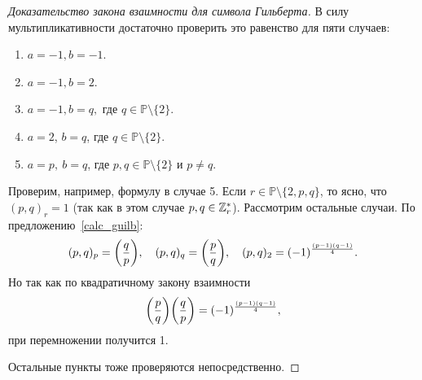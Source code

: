 		\begin{proof}[Доказательство закона взаимности для символа Гильберта]
			В силу мультипликативности достаточно проверить это равенство для пяти случаев: 
			\begin{enumerate}
				\item $a = -1, b = -1$.
				\item $a = -1, b = 2$.
				\item $a = -1, b = q, $ где $q \in \mathbb{P} \setminus \{ 2 \}$. 
				\item $a = 2$, $b = q$, где $q \in \mathbb{P} \setminus \{ 2 \}$.
				\item $a = p, \ b = q$, где $p, q \in \mathbb{P} \setminus \{ 2 \}$ и $p \neq q$.
			\end{enumerate}
			Проверим, например, формулу в случае 5. Если  $r \in \mathbb{P} \setminus \{ 2, p, q \}$, то ясно, что $(p, q)_{r} = 1$ (так как в этом случае $p, q \in \mathbb{Z}_{r}^{*}$). 
			Рассмотрим остальные случаи. По предложению~\ref{calc_guilb}:
			\[
				(p, q)_{p} = \lr*{\frac{q}{p}}, \quad (p, q)_{q} = \lr*{\frac{p}{q}}, \quad (p, q)_{2} = (-1)^{\frac{(p - 1)(q - 1)}{4}}.
			\]
			Но так как по квадратичному закону взаимности
			\[
				\lr*{\frac{p}{q}}\lr*{\frac{q}{p}} = (-1)^{\frac{(p - 1)(q - 1)}{4}},
			\]
			при перемножении получится 1. 

			Остальные пункты тоже проверяются непосредственно. 
		\end{proof}
	



	


	 




